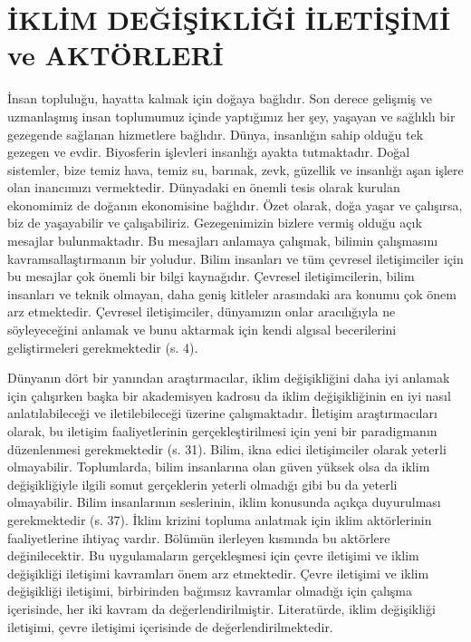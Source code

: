\documentclass[
]{book}
\begin{document}
\hypertarget{iklim-deux11fiux15fikliux11fi-iletiux15fimi-ve-aktuxf6rleri}{%
\chapter{İKLİM DEĞİŞİKLİĞİ İLETİŞİMİ ve AKTÖRLERİ}\label{iklim-deux11fiux15fikliux11fi-iletiux15fimi-ve-aktuxf6rleri}}

İnsan topluluğu, hayatta kalmak için doğaya bağlıdır. Son derece gelişmiş ve uzmanlaşmış insan toplumumuz içinde yaptığımız her şey, yaşayan ve sağlıklı bir gezegende sağlanan hizmetlere bağlıdır. Dünya, insanlığın sahip olduğu tek gezegen ve evdir. Biyosferin işlevleri insanlığı ayakta tutmaktadır. Doğal sistemler, bize temiz hava, temiz su, barınak, zevk, güzellik ve insanlığı aşan işlere olan inancımızı vermektedir. Dünyadaki en önemli tesis olarak kurulan ekonomimiz de doğanın ekonomisine bağlıdır. Özet olarak, doğa yaşar ve çalışırsa, biz de yaşayabilir ve çalışabiliriz. Gezegenimizin bizlere vermiş olduğu açık mesajlar bulunmaktadır. Bu mesajları anlamaya çalışmak, bilimin çalışmasını kavramsallaştırmanın bir yoludur. Bilim insanları ve tüm çevresel iletişimciler için bu mesajlar çok önemli bir bilgi kaynağıdır. Çevresel iletişimcilerin, bilim insanları ve teknik olmayan, daha geniş kitleler arasındaki ara konumu çok önem arz etmektedir. Çevresel iletişimciler, dünyamızın onlar aracılığıyla ne söyleyeceğini anlamak ve bunu aktarmak için kendi algısal becerilerini geliştirmeleri gerekmektedir (s. 4). \citep{jurin2010environmental}

Dünyanın dört bir yanından araştırmacılar, iklim değişikliğini daha iyi anlamak için çalışırken başka bir akademisyen kadrosu da iklim değişikliğinin en iyi nasıl anlatılabileceği ve iletilebileceği üzerine çalışmaktadır. İletişim araştırmacıları olarak, bu iletişim faaliyetlerinin gerçekleştirilmesi için yeni bir paradigmanın düzenlenmesi gerekmektedir (s. 31). \citep{hansen2016communicating} Bilim, ikna edici iletişimciler olarak yeterli olmayabilir. Toplumlarda, bilim insanlarına olan güven yüksek olsa da iklim değişikliğiyle ilgili somut gerçeklerin yeterli olmadığı gibi bu da yeterli olmayabilir. Bilim insanlarının seslerinin, iklim konusunda açıkça duyurulması gerekmektedir (s. 37). \citep{hansen2016communicating} İklim krizini topluma anlatmak için iklim aktörlerinin faaliyetlerine ihtiyaç vardır. Bölümün ilerleyen kısmında bu aktörlere değinilecektir. Bu uygulamaların gerçekleşmesi için çevre iletişimi ve iklim değişikliği iletişimi kavramları önem arz etmektedir. Çevre iletişimi ve iklim değişikliği iletişimi, birbirinden bağımsız kavramlar olmadığı için çalışma içerisinde, her iki kavram da değerlendirilmiştir. Literatürde, iklim değişikliği iletişimi, çevre iletişimi içerisinde de değerlendirilmektedir.
\end{document}
